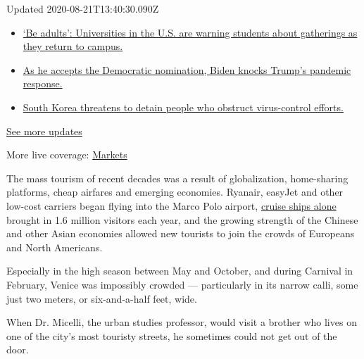Updated 2020-08-21T13:40:30.090Z

\begin{itemize}
\tightlist
\item
  \href{https://www.nytimes3xbfgragh.onion/2020/08/21/world/covid-19-coronavirus.html?action=click\&pgtype=Article\&state=default\&region=MAIN_CONTENT_1\&context=storylines_live_updates\#link-6a60a19d}{`Be
  adults': Universities in the U.S. are warning students about
  gatherings as they return to campus.}
\item
  \href{https://www.nytimes3xbfgragh.onion/2020/08/21/world/covid-19-coronavirus.html?action=click\&pgtype=Article\&state=default\&region=MAIN_CONTENT_1\&context=storylines_live_updates\#link-324af071}{As
  he accepts the Democratic nomination, Biden knocks Trump's pandemic
  response.}
\item
  \href{https://www.nytimes3xbfgragh.onion/2020/08/21/world/covid-19-coronavirus.html?action=click\&pgtype=Article\&state=default\&region=MAIN_CONTENT_1\&context=storylines_live_updates\#link-191d44be}{South
  Korea threatens to detain people who obstruct virus-control efforts.}
\end{itemize}

\href{https://www.nytimes3xbfgragh.onion/2020/08/21/world/covid-19-coronavirus.html?action=click\&pgtype=Article\&state=default\&region=MAIN_CONTENT_1\&context=storylines_live_updates}{See
more updates}

More live coverage:
\href{https://www.nytimes3xbfgragh.onion/live/2020/08/21/business/stock-market-today-coronavirus?action=click\&pgtype=Article\&state=default\&region=MAIN_CONTENT_1\&context=storylines_live_updates}{Markets}

The mass tourism of recent decades was a result of globalization,
home-sharing platforms, cheap airfares and emerging economies. Ryanair,
easyJet and other low-cost carriers began flying into the Marco Polo
airport,
\href{https://www.port.venice.it/files/page/portofvenice4-2019_0.pdf}{cruise
ships alone} brought in 1.6 million visitors each year, and the growing
strength of the Chinese and other Asian economies allowed new tourists
to join the crowds of Europeans and North Americans.

Especially in the high season between May and October, and during
Carnival in February, Venice was impossibly crowded --- particularly in
its narrow calli, some just two meters, or six-and-a-half feet, wide.

When Dr. Micelli, the urban studies professor, would visit a brother who
lives on one of the city's most touristy streets, he sometimes could not
get out of the door.

